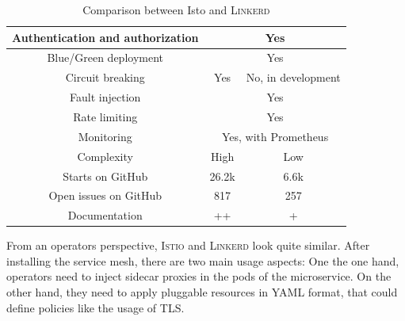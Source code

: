 \begin{table}
\begin{tabular*}{\columnwidth}{c|c|c}
Authentication and authorization & \multicolumn{2}{c}{Yes}                                                                                                          \\\hline
Blue/Green deployment            & \multicolumn{2}{c}{Yes}                                                                                                          \\\hline
Circuit breaking                 & Yes                                                                                                                & No, in development          \\\hline
Fault injection                  & \multicolumn{2}{c}{Yes}                                                                                                          \\\hline
Rate limiting                    & \multicolumn{2}{c}{Yes}                                                                                                          \\\hline
Monitoring                       & \multicolumn{2}{c}{Yes, with Prometheus}                                                                                         \\\hline
Complexity                       & High                                                                                                               & Low         \\\hline
Starts on GitHub \cite{linkerd-github} \cite{istio-github}              & 26.2k & 6.6k        \\\hline
Open issues on GitHub \cite{linkerd-github} \cite{istio-github}                 & 817                                                                                                                & 257         \\\hline
Documentation                    & ++                                                                                                                 & +          
\end{tabular*}
\vspace{0.25mm}
\caption{Comparison between Isto and \textsc{Linkerd}}
\label{tab:istio-linkerd}
\end{table}


%
%
%
%

From an operators perspective, \textsc{Istio} and \textsc{Linkerd} look quite similar. After installing the service mesh, there are two main usage aspects: One the one hand, operators need to inject sidecar proxies in the pods of the microservice. On the other hand, they need to apply pluggable resources in YAML format, that could define policies like the usage of TLS.

